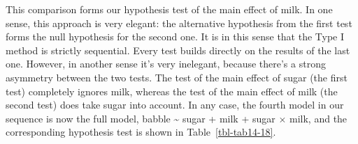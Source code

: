 \documentclass[
  a4paper,
]{book}
\begin{document}
This comparison forms our hypothesis test of the main effect of milk. In
one sense, this approach is very elegant: the alternative hypothesis
from the first test forms the null hypothesis for the second one. It is
in this sense that the Type I method is strictly sequential. Every test
builds directly on the results of the last one. However, in another
sense it's very inelegant, because there's a strong asymmetry between
the two tests. The test of the main effect of sugar (the first test)
completely ignores milk, whereas the test of the main effect of milk
(the second test) does take sugar into account. In any case, the fourth
model in our sequence is now the full model, babble \textasciitilde{}
sugar + milk + sugar \(\times\) milk, and the corresponding hypothesis
test is shown in Table~\ref{tbl-tab14-18}.

\hypertarget{tbl-tab14-18}{}
 
  \providecommand{\huxb}[2]{\arrayrulecolor[RGB]{#1}\global\arrayrulewidth=#2pt}
  \providecommand{\huxvb}[2]{\color[RGB]{#1}\vrule width #2pt}
  \providecommand{\huxtpad}[1]{\rule{0pt}{#1}}
  \providecommand{\huxbpad}[1]{\rule[-#1]{0pt}{#1}}
\end{document}
